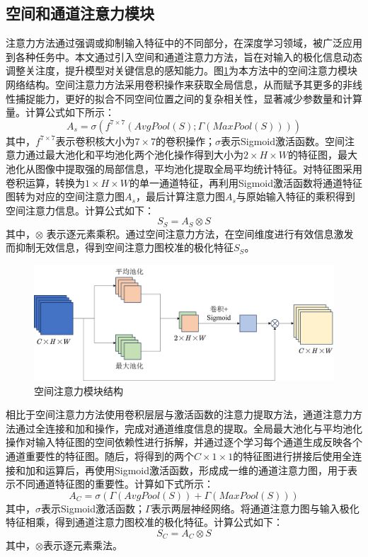 \subsection{空间和通道注意力模块}
注意力方法通过强调或抑制输入特征中的不同部分，在深度学习领域，被广泛应用到各种任务中。本文通过引入空间和通道注意力方法，旨在对输入的极化信息动态调整关注度，提升模型对关键信息的感知能力。图\ref{fig:spatial}为本方法中的空间注意力模块网络结构。空间注意力方法采用卷积操作来获取全局信息，从而赋予其更多的非线性捕捉能力，更好的拟合不同空间位置之间的复杂相关性，显著减少参数量和计算量。计算公式如下所示：
\begin{equation}
    A_s=\sigma(f^{7\times 7}(AvgPool(S);\Gamma(MaxPool(S))))
\end{equation}
其中，$f^{7\times 7}$表示卷积核大小为$7\times 7$的卷积操作；$\sigma$表示Sigmoid激活函数。空间注意力通过最大池化和平均池化两个池化操作得到大小为$2\times H \times W$的特征图，最大池化从图像中提取强的局部信息，平均池化提取全局平均统计特征。对特征图采用卷积运算，转换为$1\times H\times W$的单一通道特征，再利用Sigmoid激活函数将通道特征图转为对应的空间注意力图$A_s$，最后计算注意力图$A_s$与原始输入特征的乘积得到空间注意力信息。计算公式如下：
\begin{equation}
    S_S=A_S \otimes S
\end{equation}
其中，$\otimes$ 表示逐元素乘积。通过空间注意力方法，在空间维度进行有效信息激发而抑制无效信息，得到空间注意力图校准的极化特征$S_S$。

\label{sec:空间和通道注意力模块}
\begin{figure}[ht!]
    \centering
    \includegraphics[width=14cm]{pic/chapter3/Spatial.png}
    \caption{空间注意力模块结构}
    \label{fig:spatial}
\end{figure}

相比于空间注意力方法使用卷积层层与激活函数的注意力提取方法，通道注意力方法通过全连接和加和操作，完成对通道维度信息的提取。全局最大池化与平均池化操作对输入特征图的空间依赖性进行拆解，并通过逐个学习每个通道生成反映各个通道重要性的特征图。随后，将得到的两个$C\times 1 \times 1$的特征图进行拼接后使用全连接和加和运算后，再使用Sigmoid激活函数，形成成一维的通道注意力图，用于表示不同通道特征图的重要性。计算如下式所示：
\begin{equation}
    A_C=\sigma(\Gamma(AvgPool(S))+\Gamma(MaxPool(S)))
\end{equation}
其中，$\sigma$表示Sigmoid激活函数；$\Gamma$表示两层神经网络。将通道注意力图与输入极化特征相乘，得到通道注意力图校准的极化特征。计算公式如下：
\begin{equation}
    S_C=A_C \otimes S
\end{equation}
其中，$\otimes$表示逐元素乘法。


